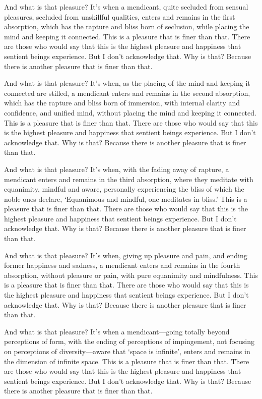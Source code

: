 \documentclass[12pt,openany]{book}%
\begin{document}
And what is that pleasure? It’s when a mendicant, quite secluded from sensual pleasures, secluded from unskillful qualities, enters and remains in the first absorption, which has the rapture and bliss born of seclusion, while placing the mind and keeping it connected. This is a pleasure that is finer than that. There are those who would say that this is the highest pleasure and happiness that sentient beings experience. But I don’t acknowledge that. Why is that? Because there is another pleasure that is finer than that. 

And what is that pleasure? It’s when, as the placing of the mind and keeping it connected are stilled, a mendicant enters and remains in the second absorption, which has the rapture and bliss born of immersion, with internal clarity and confidence, and unified mind, without placing the mind and keeping it connected. This is a pleasure that is finer than that. There are those who would say that this is the highest pleasure and happiness that sentient beings experience. But I don’t acknowledge that. Why is that? Because there is another pleasure that is finer than that. 

And what is that pleasure? It’s when, with the fading away of rapture, a mendicant enters and remains in the third absorption, where they meditate with equanimity, mindful and aware, personally experiencing the bliss of which the noble ones declare, ‘Equanimous and mindful, one meditates in bliss.’ This is a pleasure that is finer than that. There are those who would say that this is the highest pleasure and happiness that sentient beings experience. But I don’t acknowledge that. Why is that? Because there is another pleasure that is finer than that. 

And what is that pleasure? It’s when, giving up pleasure and pain, and ending former happiness and sadness, a mendicant enters and remains in the fourth absorption, without pleasure or pain, with pure equanimity and mindfulness. This is a pleasure that is finer than that. There are those who would say that this is the highest pleasure and happiness that sentient beings experience. But I don’t acknowledge that. Why is that? Because there is another pleasure that is finer than that. 

And what is that pleasure? It’s when a mendicant—going totally beyond perceptions of form, with the ending of perceptions of impingement, not focusing on perceptions of diversity—aware that ‘space is infinite’, enters and remains in the dimension of infinite space. This is a pleasure that is finer than that. There are those who would say that this is the highest pleasure and happiness that sentient beings experience. But I don’t acknowledge that. Why is that? Because there is another pleasure that is finer than that. 
\end{document}
